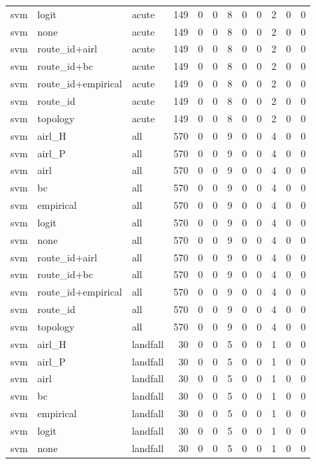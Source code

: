 \begin{tabular}{lllrrrrrrrrr}
svm & logit & acute & 149 & 0 & 0 & 8 & 0 & 0 & 2 & 0 & 0 \\
svm & none & acute & 149 & 0 & 0 & 8 & 0 & 0 & 2 & 0 & 0 \\
svm & route_id+airl & acute & 149 & 0 & 0 & 8 & 0 & 0 & 2 & 0 & 0 \\
svm & route_id+bc & acute & 149 & 0 & 0 & 8 & 0 & 0 & 2 & 0 & 0 \\
svm & route_id+empirical & acute & 149 & 0 & 0 & 8 & 0 & 0 & 2 & 0 & 0 \\
svm & route_id & acute & 149 & 0 & 0 & 8 & 0 & 0 & 2 & 0 & 0 \\
svm & topology & acute & 149 & 0 & 0 & 8 & 0 & 0 & 2 & 0 & 0 \\
svm & airl_H & all & 570 & 0 & 0 & 9 & 0 & 0 & 4 & 0 & 0 \\
svm & airl_P & all & 570 & 0 & 0 & 9 & 0 & 0 & 4 & 0 & 0 \\
svm & airl & all & 570 & 0 & 0 & 9 & 0 & 0 & 4 & 0 & 0 \\
svm & bc & all & 570 & 0 & 0 & 9 & 0 & 0 & 4 & 0 & 0 \\
svm & empirical & all & 570 & 0 & 0 & 9 & 0 & 0 & 4 & 0 & 0 \\
svm & logit & all & 570 & 0 & 0 & 9 & 0 & 0 & 4 & 0 & 0 \\
svm & none & all & 570 & 0 & 0 & 9 & 0 & 0 & 4 & 0 & 0 \\
svm & route_id+airl & all & 570 & 0 & 0 & 9 & 0 & 0 & 4 & 0 & 0 \\
svm & route_id+bc & all & 570 & 0 & 0 & 9 & 0 & 0 & 4 & 0 & 0 \\
svm & route_id+empirical & all & 570 & 0 & 0 & 9 & 0 & 0 & 4 & 0 & 0 \\
svm & route_id & all & 570 & 0 & 0 & 9 & 0 & 0 & 4 & 0 & 0 \\
svm & topology & all & 570 & 0 & 0 & 9 & 0 & 0 & 4 & 0 & 0 \\
svm & airl_H & landfall & 30 & 0 & 0 & 5 & 0 & 0 & 1 & 0 & 0 \\
svm & airl_P & landfall & 30 & 0 & 0 & 5 & 0 & 0 & 1 & 0 & 0 \\
svm & airl & landfall & 30 & 0 & 0 & 5 & 0 & 0 & 1 & 0 & 0 \\
svm & bc & landfall & 30 & 0 & 0 & 5 & 0 & 0 & 1 & 0 & 0 \\
svm & empirical & landfall & 30 & 0 & 0 & 5 & 0 & 0 & 1 & 0 & 0 \\
svm & logit & landfall & 30 & 0 & 0 & 5 & 0 & 0 & 1 & 0 & 0 \\
svm & none & landfall & 30 & 0 & 0 & 5 & 0 & 0 & 1 & 0 & 0 \\

\end{tabular}
